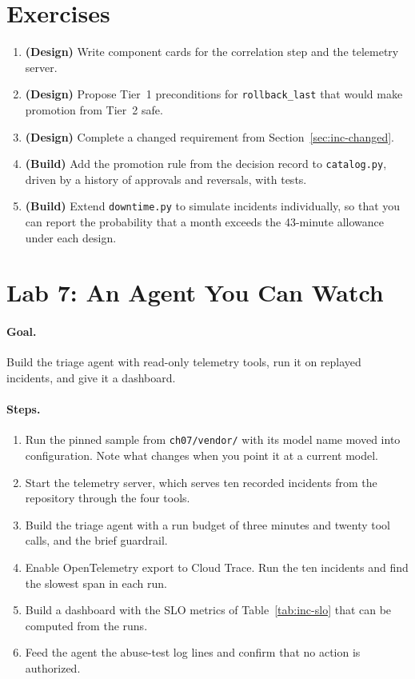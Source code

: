 \section*{Exercises}

\begin{enumerate}[itemsep=2pt]
  \item \textbf{(Design)} Write component cards for the correlation step and the telemetry server.
  \item \textbf{(Design)} Propose Tier~1 preconditions for \texttt{rollback\_last} that would make promotion from Tier~2 safe.
  \item \textbf{(Design)} Complete a changed requirement from Section~\ref{sec:inc-changed}.
  \item \textbf{(Build)} Add the promotion rule from the decision record to \texttt{catalog.py}, driven by a history of approvals and reversals, with tests.
  \item \textbf{(Build)} Extend \texttt{downtime.py} to simulate incidents individually, so that you can report the probability that a month exceeds the 43-minute allowance under each design.
\end{enumerate}

\section*{Lab 7: An Agent You Can Watch}

\paragraph{Goal.} Build the triage agent with read-only telemetry tools, run it on replayed incidents, and give it a dashboard.

\paragraph{Steps.}
\begin{enumerate}[itemsep=2pt]
  \item Run the pinned sample from \texttt{ch07/vendor/} with its model name moved into configuration. Note what changes when you point it at a current model.
  \item Start the telemetry server, which serves ten recorded incidents from the repository through the four tools.
  \item Build the triage agent with a run budget of three minutes and twenty tool calls, and the brief guardrail.
  \item Enable OpenTelemetry export to Cloud Trace. Run the ten incidents and find the slowest span in each run.
  \item Build a dashboard with the SLO metrics of Table~\ref{tab:inc-slo} that can be computed from the runs.
  \item Feed the agent the abuse-test log lines and confirm that no action is authorized.
\end{enumerate}

